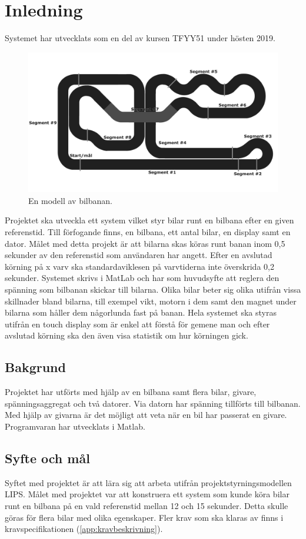 \section{Inledning}
Systemet har utvecklats som en del av kursen TFYY51 under hösten 2019.  

\begin{figure}
	\centering
	\includegraphics[width=\linewidth] {Figures/BanaModell}
	\caption{En modell av bilbanan.}
	\label{fig:bilbanan}
\end{figure}

Projektet ska utveckla ett system vilket styr bilar runt en bilbana efter en
given referenstid. Till förfogande finns, en bilbana, ett antal bilar, en
display samt en dator.  Målet med detta projekt är att bilarna skas köras runt
banan inom 0,5 sekunder av den referenstid som användaren har angett. Efter en
avslutad körning på x varv ska standardaviklesen på varvtiderna inte överskrida
0,2 sekunder. Systemet skrivs i MatLab och har som huvudsyfte att reglera den
spänning som bilbanan skickar till bilarna. Olika bilar beter sig olika utifrån
vissa skillnader bland bilarna, till exempel vikt, motorn i dem samt den magnet
under bilarna som håller dem någorlunda fast på banan.  Hela systemet ska styras
utifrån en touch display som är enkel att förstå för gemene man och efter
avslutad körning ska den även visa statistik om hur körningen gick. 

\subsection{Bakgrund} 

Projektet har utförts med hjälp av en bilbana samt flera bilar, givare,
spänningsaggregat och två datorer. Via datorn har spänning
tillförts till bilbanan. Med hjälp av givarna är det möjligt att veta när en bil
har passerat en givare. Programvaran har utvecklats i Matlab.

\subsection{Syfte och mål}

Syftet med projektet är att lära sig att arbeta utifrån
projektstyrningsmodellen LIPS. Målet med projektet var att konstruera ett system
som kunde köra bilar runt en bilbana på en vald referenstid mellan 12 och 15
sekunder. Detta skulle göras för flera bilar med olika egenskaper. Fler krav som
ska klaras av finns i kravspecifikationen (\ref{app:kravbeskrivning}).

